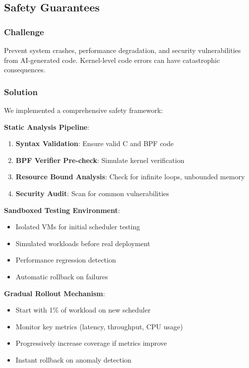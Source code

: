 \subsection{Safety Guarantees}

\subsubsection{Challenge}
Prevent system crashes, performance degradation, and security vulnerabilities from AI-generated code. Kernel-level code errors can have catastrophic consequences.

\subsubsection{Solution}
We implemented a comprehensive safety framework:

\textbf{Static Analysis Pipeline}:
\begin{enumerate}
\item \textbf{Syntax Validation}: Ensure valid C and BPF code
\item \textbf{BPF Verifier Pre-check}: Simulate kernel verification
\item \textbf{Resource Bound Analysis}: Check for infinite loops, unbounded memory
\item \textbf{Security Audit}: Scan for common vulnerabilities
\end{enumerate}

\textbf{Sandboxed Testing Environment}:
\begin{itemize}
\item Isolated VMs for initial scheduler testing
\item Simulated workloads before real deployment
\item Performance regression detection
\item Automatic rollback on failures
\end{itemize}

\textbf{Gradual Rollout Mechanism}:
\begin{itemize}
\item Start with 1\% of workload on new scheduler
\item Monitor key metrics (latency, throughput, CPU usage)
\item Progressively increase coverage if metrics improve
\item Instant rollback on anomaly detection
\end{itemize}

